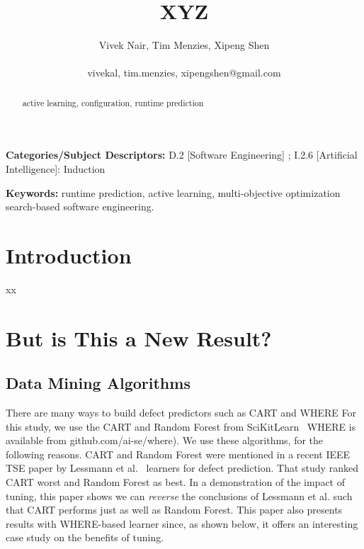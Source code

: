 \documentclass{sig-alternative}
\begin{document}
\title{ XYZ}
\author{\alignauthor Vivek Nair, Tim Menzies, Xipeng Shen \\
       \\
       vivekal, tim.menzies, xipengshen@gmail.com}
\maketitle 
\thispagestyle{plain}
\pagestyle{plain}
\begin{abstract}
active learning, configuration, runtime prediction

\end{abstract}

\vspace{1mm}
\noindent
{\bf Categories/Subject Descriptors:} 
D.2 [Software Engineering] ;
I.2.6 [Artificial Intelligence]: Induction

 
\vspace{1mm}
\noindent
{\bf Keywords:} runtime prediction, active learning, 
multi-objective optimization
search-based software engineering.

 
 
\section{Introduction}
 
xx

\section{But is This a New Result?}


 

\subsection{Data Mining Algorithms}
 
There are many ways to build defect predictors
such as  CART
and WHERE
For this study, we use the CART and Random Forest  from 
SciKitLearn~
WHERE is available from
github.com/ai-se/where).
 We use  these algorithms, for the following reasons.
CART and Random Forest were mentioned in
a recent IEEE TSE paper by Lessmann et al.~
learners for  defect prediction.
That study ranked  CART  worst  and Random Forest as best.
In a demonstration of the impact of tuning,
this paper shows  we can {\em reverse} the conclusions of  Lessmann et al. such that CART
performs just as well as
 Random Forest.
This
 paper also presents results with WHERE-based learner since, as shown below,
it offers an interesting case study on the benefits of tuning.
  
\end{document}
